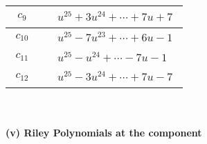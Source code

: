 \documentclass[1p]{elsarticle_modified}
\theoremstyle{definition}
\begin{document}
\begin{tabular}{m{50pt}|m{274pt}}
\hline $$\begin{aligned}c_{9}\end{aligned}$$&$\begin{aligned}
&u^{25}+3 u^{24}+\cdots+7 u+7
\end{aligned}$\\
\hline $$\begin{aligned}c_{10}\end{aligned}$$&$\begin{aligned}
&u^{25}-7 u^{23}+\cdots+6 u-1
\end{aligned}$\\
\hline $$\begin{aligned}c_{11}\end{aligned}$$&$\begin{aligned}
&u^{25}- u^{24}+\cdots-7 u-1
\end{aligned}$\\
\hline $$\begin{aligned}c_{12}\end{aligned}$$&$\begin{aligned}
&u^{25}-3 u^{24}+\cdots+7 u-7
\end{aligned}$\\
\hline
\end{tabular}\\~\\
\newpage\renewcommand{\arraystretch}{1}
\flushleft \textbf{(v) Riley Polynomials at the component}\newline \\
\end{document}
